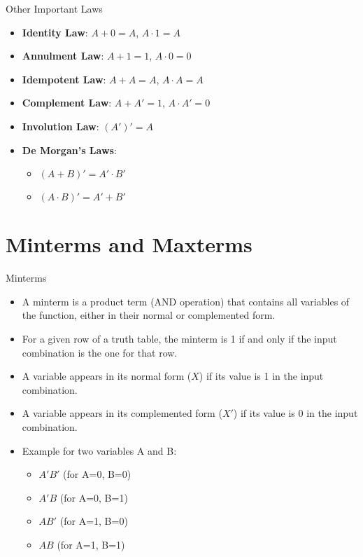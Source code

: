 \documentclass{beamer}
\begin{document}
\begin{frame}{Other Important Laws}
    \begin{itemize}
        \item \textbf{Identity Law}: $A + 0 = A$, $A \cdot 1 = A$
        \item \textbf{Annulment Law}: $A + 1 = 1$, $A \cdot 0 = 0$
        \item \textbf{Idempotent Law}: $A + A = A$, $A \cdot A = A$
        \item \textbf{Complement Law}: $A + A' = 1$, $A \cdot A' = 0$
        \item \textbf{Involution Law}: $(A')' = A$
        \item \textbf{De Morgan's Laws}:
              \begin{itemize}
                \item $(A + B)' = A' \cdot B'$
                \item $(A \cdot B)' = A' + B'$
              \end{itemize}
    \end{itemize}
\end{frame}


\section{Minterms and Maxterms}

\begin{frame}{Minterms}
    \begin{itemize}
        \item A minterm is a product term (AND operation) that contains all
        variables of the function, either in their normal or complemented form.
        \item For a given row of a truth table, the minterm is 1 if and only if
        the input combination is the one for that row.
        \item A variable appears in its normal form ($X$) if its value is 1 in
        the input combination.
        \item A variable appears in its complemented form ($X'$) if its value is
        0 in the input combination.
        \item Example for two variables A and B:
            \begin{itemize}
                \item $A'B'$ (for A=0, B=0)
                \item $A'B$ (for A=0, B=1)
                \item $AB'$ (for A=1, B=0)
                \item $AB$ (for A=1, B=1)
            \end{itemize}
    \end{itemize}
\end{frame}
\end{document}
